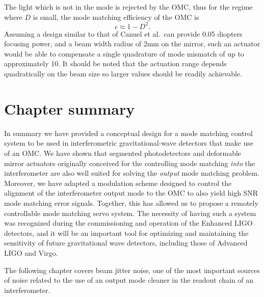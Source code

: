 The light which is not in the  mode is rejected by the OMC, thus for the regime where $D$ is small, the mode matching efficiency of the OMC is
\begin{equation}
\epsilon \approx 1 - D^2.
\end{equation}
Assuming a design similar to that of Canuel et al.\ can provide 0.05 diopters focusing power, and a beam width radius of 2mm on the mirror, such an actuator would be able to compensate a single quadrature of mode mismatch of up to approximately 10\perc{}. %
It should be noted that the actuation range depends quadratically on the beam size so larger values should be readily achievable.

\section{Chapter summary}
In summary we have provided a conceptual design for a mode matching control system to be used in interferometric gravitational-wave detectors that make use of an OMC. %
We have shown that segmented photodetectors and deformable mirror actuators originally conceived for the controlling mode matching {\it into} the interferometer are also well suited for solving the {\it output }mode matching problem. %
Moreover, we have adapted a modulation scheme designed to control the alignment of the interferometer output mode to the OMC to also yield high SNR mode matching error signals. %
Together, this has allowed us to propose a remotely controllable mode matching servo system. %
The necessity of having such a system was recognized during the commissioning and operation of the Enhanced LIGO detectors, and it will be an important tool for optimizing and maintaining the sensitivity of future gravitational wave detectors, including those of Advanced LIGO and Virgo.

The following chapter covers beam jitter noise, one of the most important sources of noise related to the use of an output mode cleaner in the readout chain of an interferometer.
